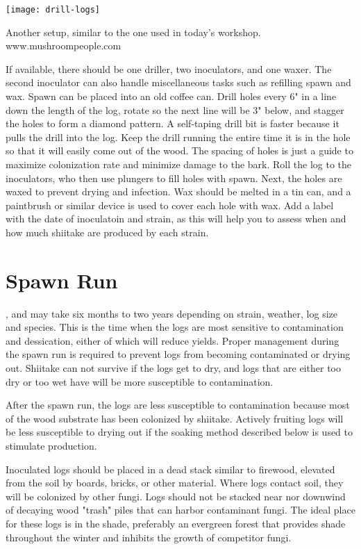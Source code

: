 \documentclass{tufte-handout}
\begin{document}
\begin{marginfigure}
\texttt{[image: drill-logs]}
\caption{Another setup, similar to the one  used in today's workshop. www.mushroompeople.com}
\end{marginfigure}

If available, there should be one driller, two inoculators, and one waxer.
The second inoculator can also handle miscellaneous tasks such as refilling spawn and wax.
Spawn can be placed into an old coffee can. 
Drill holes every 6" in a line down the length of the log, rotate so the next line will be 3" below, and stagger the holes to form a diamond pattern. 
A self-taping drill bit is faster because it pulls the drill into the log.
Keep the drill running the entire time it is in the hole so that it will easily come out of the wood. 
The spacing of holes is just a guide to maximize colonization rate
and minimize damage to the bark. 
Roll the log to the inoculators, who then use plungers to fill holes with spawn.
Next, the holes are waxed to prevent
drying and infection. 
Wax should be melted in a tin can, and a paintbrush or similar device is used to cover each hole with wax.
Add a label with the date of inoculatoin and strain, as this will help you to assess
when and how much shiitake are produced
by each strain.

\section{Spawn Run}

, and may take six months to two years depending on strain, weather, log size and species.
This is the time when the logs are most sensitive to contamination and dessication,  either of which will reduce yields.
Proper management during the spawn run is required to prevent logs from becoming contaminated or drying out.
Shiitake can not survive if the logs get to dry, and logs that are either too dry or too wet have will be more susceptible to contamination.

After the spawn run, the logs are less susceptible to contamination because most of the wood substrate has been colonized by shiitake. 
Actively fruiting logs will be less susceptible to drying out if the soaking method described below is used to stimulate production. 

Inoculated logs should be placed in a dead stack similar to firewood, elevated from the soil by boards, bricks, or other material. 
Where logs contact soil, they will be colonized by other fungi. 
Logs should not be stacked near nor downwind of decaying wood "trash" piles that can harbor contaminant fungi.
The ideal place for these logs is in the shade, preferably an evergreen forest that provides shade throughout the winter and inhibits the growth of competitor fungi.
\end{document}
